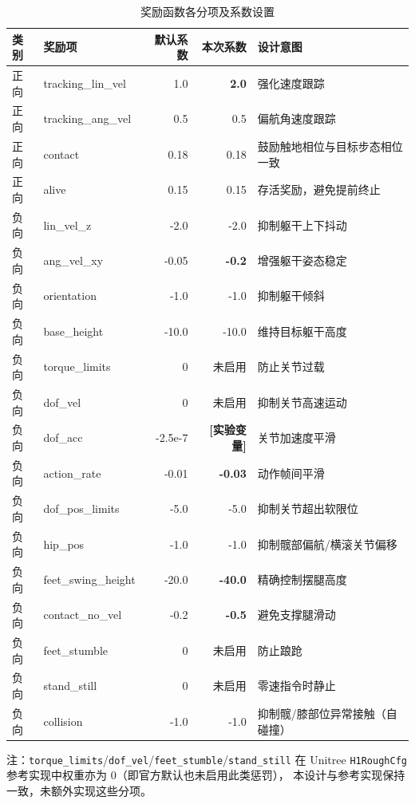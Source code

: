 \documentclass[12pt, a4paper]{article}
\begin{document}
\begin{table}[H]
\centering
\caption{奖励函数各分项及系数设置}
\label{tab:reward}
\begin{tabular}{llrrp{4.5cm}}
\toprule
类别 & 奖励项 & 默认系数 & 本次系数 & 设计意图 \\
\midrule
正向 & tracking\_lin\_vel & 1.0 & \textbf{2.0} & 强化速度跟踪 \\
正向 & tracking\_ang\_vel & 0.5 & 0.5 & 偏航角速度跟踪 \\
正向 & contact & 0.18 & 0.18 & 鼓励触地相位与目标步态相位一致 \\
正向 & alive & 0.15 & 0.15 & 存活奖励，避免提前终止 \\
\midrule
负向 & lin\_vel\_z & -2.0 & -2.0 & 抑制躯干上下抖动 \\
负向 & ang\_vel\_xy & -0.05 & \textbf{-0.2} & 增强躯干姿态稳定 \\
负向 & orientation & -1.0 & -1.0 & 抑制躯干倾斜 \\
负向 & base\_height & -10.0 & -10.0 & 维持目标躯干高度 \\
负向 & torque\_limits & 0 & 未启用 & 防止关节过载 \\
负向 & dof\_vel & 0 & 未启用 & 抑制关节高速运动 \\
负向 & dof\_acc & -2.5e-7 & \textbf{[实验变量]} & 关节加速度平滑 \\
负向 & action\_rate & -0.01 & \textbf{-0.03} & 动作帧间平滑 \\
负向 & dof\_pos\_limits & -5.0 & -5.0 & 抑制关节超出软限位 \\
负向 & hip\_pos & -1.0 & -1.0 & 抑制髋部偏航/横滚关节偏移 \\
负向 & feet\_swing\_height & -20.0 & \textbf{-40.0} & 精确控制摆腿高度 \\
负向 & contact\_no\_vel & -0.2 & \textbf{-0.5} & 避免支撑腿滑动 \\
负向 & feet\_stumble & 0 & 未启用 & 防止踉跄 \\
负向 & stand\_still & 0 & 未启用 & 零速指令时静止 \\
负向 & collision & -1.0 & -1.0 & 抑制髋/膝部位异常接触（自碰撞） \\
\bottomrule
\end{tabular}
\end{table}

\noindent\footnotesize 注：\texttt{torque\_limits}/\texttt{dof\_vel}/\texttt{feet\_stumble}/\texttt{stand\_still}
在 Unitree \texttt{H1RoughCfg} 参考实现中权重亦为 0（即官方默认也未启用此类惩罚），
本设计与参考实现保持一致，未额外实现这些分项。\par\normalsize
\end{document}
